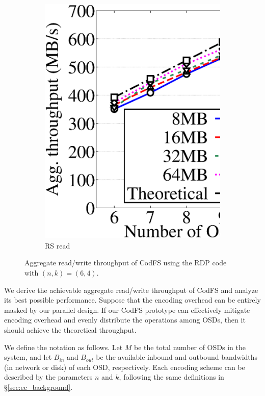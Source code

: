 \begin{figure}[!t]
\begin{subfigure}{0.48\linewidth}
     \includegraphics[width=\linewidth]{charts/transfer/eps/down/rs_6}
     \caption{RS read}
     \label{fig:rs_read}
 \end{subfigure}
 \caption{Aggregate read/write throughput of CodFS using the RDP code with
	 $(n,k)=(6,4)$.}
 \label{fig:data}
\end{figure}


We derive the achievable aggregate read/write throughput of CodFS and analyze
its best possible performance.  Suppose that the encoding overhead can be
entirely masked by our parallel design.  If our CodFS prototype can
effectively mitigate encoding overhead and evenly distribute the operations
among OSDs, then it should achieve the theoretical throughput. 

We define the notation as follows.  Let $M$ be the total number of OSDs in the
system, and let $B_{in}$ and $B_{out}$ be the available inbound and outbound
bandwidths (in network or disk) of each OSD, respectively.  Each encoding scheme
can be described by the parameters $n$ and $k$, following the same definitions
in \S\ref{sec:ec_background}.  

